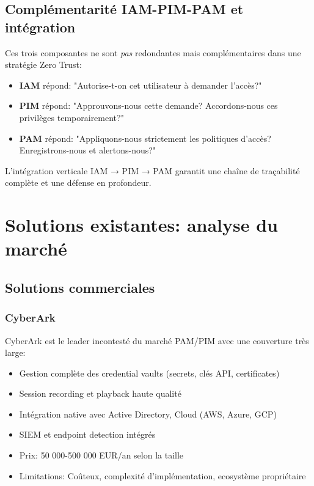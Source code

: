 \subsection{Complémentarité IAM-PIM-PAM et intégration}

Ces trois composantes ne sont \textit{pas} redondantes mais complémentaires dans une stratégie Zero Trust:

\begin{itemize}
    \item \textbf{IAM} répond: "Autorise-t-on cet utilisateur à demander l'accès?"
    \item \textbf{PIM} répond: "Approuvons-nous cette demande? Accordons-nous ces privilèges temporairement?"
    \item \textbf{PAM} répond: "Appliquons-nous strictement les politiques d'accès? Enregistrons-nous et alertons-nous?"
\end{itemize}

L'intégration verticale IAM → PIM → PAM garantit une chaîne de traçabilité complète et une défense en profondeur.

\section{Solutions existantes: analyse du marché}

\subsection{Solutions commerciales}

\subsubsection{CyberArk}

CyberArk est le leader incontesté du marché PAM/PIM avec une couverture très large:
\begin{itemize}
    \item Gestion complète des credential vaults (secrets, clés API, certificates)
    \item Session recording et playback haute qualité
    \item Intégration native avec Active Directory, Cloud (AWS, Azure, GCP)
    \item SIEM et endpoint detection intégrés
    \item Prix: 50 000-500 000 EUR/an selon la taille
    \item Limitations: Coûteux, complexité d'implémentation, ecosystème propriétaire
\end{itemize}

